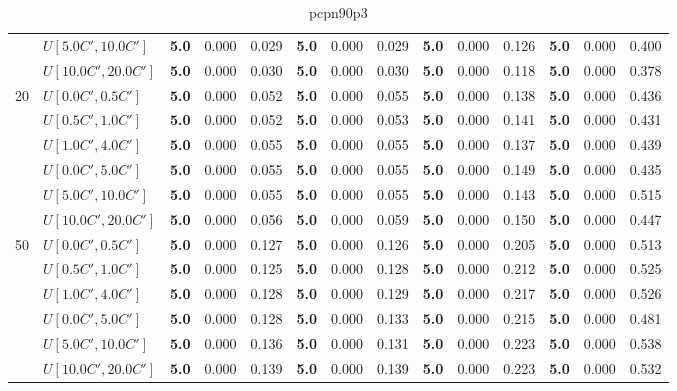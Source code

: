 \begin{table}[h]
{\begin{tabular}{|l|l||l|l|l||l|l|l||l|l|l||l|l|l|}
       & $U[5.0C',10.0C']$ & \textbf{5.0} & 0.000 & 0.029 & \textbf{5.0} & 0.000 & 0.029 & \textbf{5.0} & 0.000 & 0.126 & \textbf{5.0} & 0.000 & 0.400 \\
       & $U[10.0C',20.0C']$ & \textbf{5.0} & 0.000 & 0.030 & \textbf{5.0} & 0.000 & 0.030 & \textbf{5.0} & 0.000 & 0.118 & \textbf{5.0} & 0.000 & 0.378 \\
      \hline\hline
      \multirow{6}{*}{20} & $U[0.0C',0.5C']$ & \textbf{5.0} & 0.000 & 0.052 & \textbf{5.0} & 0.000 & 0.055 & \textbf{5.0} & 0.000 & 0.138 & \textbf{5.0} & 0.000 & 0.436 \\
       & $U[0.5C',1.0C']$ & \textbf{5.0} & 0.000 & 0.052 & \textbf{5.0} & 0.000 & 0.053 & \textbf{5.0} & 0.000 & 0.141 & \textbf{5.0} & 0.000 & 0.431 \\
       & $U[1.0C',4.0C']$ & \textbf{5.0} & 0.000 & 0.055 & \textbf{5.0} & 0.000 & 0.055 & \textbf{5.0} & 0.000 & 0.137 & \textbf{5.0} & 0.000 & 0.439 \\
       & $U[0.0C',5.0C']$ & \textbf{5.0} & 0.000 & 0.055 & \textbf{5.0} & 0.000 & 0.055 & \textbf{5.0} & 0.000 & 0.149 & \textbf{5.0} & 0.000 & 0.435 \\
       & $U[5.0C',10.0C']$ & \textbf{5.0} & 0.000 & 0.055 & \textbf{5.0} & 0.000 & 0.055 & \textbf{5.0} & 0.000 & 0.143 & \textbf{5.0} & 0.000 & 0.515 \\
       & $U[10.0C',20.0C']$ & \textbf{5.0} & 0.000 & 0.056 & \textbf{5.0} & 0.000 & 0.059 & \textbf{5.0} & 0.000 & 0.150 & \textbf{5.0} & 0.000 & 0.447 \\
      \hline\hline
      \multirow{6}{*}{50} & $U[0.0C',0.5C']$ & \textbf{5.0} & 0.000 & 0.127 & \textbf{5.0} & 0.000 & 0.126 & \textbf{5.0} & 0.000 & 0.205 & \textbf{5.0} & 0.000 & 0.513 \\
       & $U[0.5C',1.0C']$ & \textbf{5.0} & 0.000 & 0.125 & \textbf{5.0} & 0.000 & 0.128 & \textbf{5.0} & 0.000 & 0.212 & \textbf{5.0} & 0.000 & 0.525 \\
       & $U[1.0C',4.0C']$ & \textbf{5.0} & 0.000 & 0.128 & \textbf{5.0} & 0.000 & 0.129 & \textbf{5.0} & 0.000 & 0.217 & \textbf{5.0} & 0.000 & 0.526 \\
       & $U[0.0C',5.0C']$ & \textbf{5.0} & 0.000 & 0.128 & \textbf{5.0} & 0.000 & 0.133 & \textbf{5.0} & 0.000 & 0.215 & \textbf{5.0} & 0.000 & 0.481 \\
       & $U[5.0C',10.0C']$ & \textbf{5.0} & 0.000 & 0.136 & \textbf{5.0} & 0.000 & 0.131 & \textbf{5.0} & 0.000 & 0.223 & \textbf{5.0} & 0.000 & 0.538 \\
       & $U[10.0C',20.0C']$ & \textbf{5.0} & 0.000 & 0.139 & \textbf{5.0} & 0.000 & 0.139 & \textbf{5.0} & 0.000 & 0.223 & \textbf{5.0} & 0.000 & 0.532 \\
      \hline
      \end{tabular}
      }
      \caption{pcpn90p3}
      \label{tab:pcpn90p3}\end{table}
      

